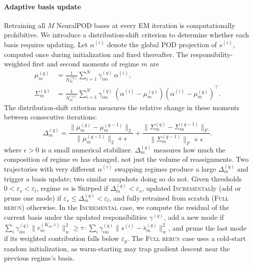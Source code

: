 \documentclass[preprint,10pt]{elsarticle}
\begin{document}
\paragraph{Adaptive basis update}
Retraining all $M$ NeuralPOD bases at every EM iteration is
computationally prohibitive.
We introduce a distribution-shift criterion to determine whether each
basis requires updating.
Let $\alpha^{(i)}$ denote the global POD projection of $s^{(i)}$,
computed once during initialization and fixed thereafter.
The responsibility-weighted first and second moments of regime $m$ are
\begin{align}
  \mu_m^{(q)}
  &= \frac{1}{N_m^{(q)}}\sum_{i=1}^N
    \gamma_{im}^{(q)}\,\alpha^{(i)},
  \label{eq:mu}\\
  \Sigma_m^{(q)}
  &= \frac{1}{N_m^{(q)}}\sum_{i=1}^N
    \gamma_{im}^{(q)}\,
    (\alpha^{(i)}-\mu_m^{(q)})(\alpha^{(i)}-\mu_m^{(q)})^\top.
  \label{eq:Sigma}
\end{align}
The distribution-shift criterion measures the relative change in these
moments between consecutive iterations:
\begin{equation}
  \Delta_m^{(q)}
  = \frac{\|\mu_m^{(q)} - \mu_m^{(q-1)}\|_2}
         {\|\mu_m^{(q-1)}\|_2 + \epsilon}
  + \frac{\|\Sigma_m^{(q)} - \Sigma_m^{(q-1)}\|_F}
         {\|\Sigma_m^{(q-1)}\|_F + \epsilon}.
  \label{eq:Delta}
\end{equation}
\noindent where $\epsilon > 0$ is a small numerical stabilizer.
$\Delta_m^{(q)}$ measures how much the composition of regime $m$ has changed,
not just the volume of reassignments.
Two trajectories with very different $\alpha^{(i)}$ swapping regimes
produce a large $\Delta_m^{(q)}$ and trigger a basis update;
two similar snapshots doing so do not.
Given thresholds $0 < \varepsilon_s < \varepsilon_l$, regime $m$ is
\textsc{Skip}ped if $\Delta_m^{(q)} < \varepsilon_s$, updated
\textsc{Incremental}ly (add or prune one mode) if
$\varepsilon_s \le \Delta_m^{(q)} < \varepsilon_l$, and fully retrained
from scratch (\textsc{Full rerun}) otherwise.
In the \textsc{Incremental} case, we compute the residual of the
current basis under the updated responsibilities $\gamma^{(q)}$, add
a new mode if $\sum_i \gamma_{im}^{(q)}\|r_m^{(K_m,i)}\|_w^2 \ge \tau\cdot\sum_i \gamma_{im}^{(q)}\|s^{(i)}-\bar{s}_m^{(q)}\|_w^2$,
and prune the last mode if its weighted contribution falls below
$\varepsilon_p$.
The \textsc{Full rerun} case uses a cold-start random initialization,
as warm-starting may trap gradient descent near the previous regime's basis.
\end{document}
